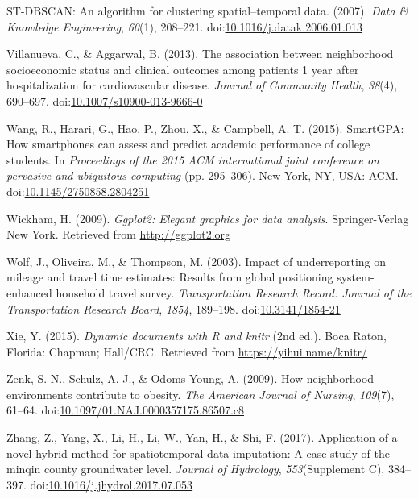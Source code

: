 \documentclass[man]{apa6}
\theoremstyle{definition}
\theoremstyle{definition}
\theoremstyle{definition}
\theoremstyle{remark}
\begin{document}
\hypertarget{ref-_st-dbscan:_2007}{}
ST-DBSCAN: An algorithm for clustering spatial--temporal data. (2007).
\emph{Data \& Knowledge Engineering}, \emph{60}(1), 208--221.
doi:\href{https://doi.org/10.1016/j.datak.2006.01.013}{10.1016/j.datak.2006.01.013}

\hypertarget{ref-villanueva_association_2013}{}
Villanueva, C., \& Aggarwal, B. (2013). The association between
neighborhood socioeconomic status and clinical outcomes among patients 1
year after hospitalization for cardiovascular disease. \emph{Journal of
Community Health}, \emph{38}(4), 690--697.
doi:\href{https://doi.org/10.1007/s10900-013-9666-0}{10.1007/s10900-013-9666-0}

\hypertarget{ref-wang_smartgpa:_2015}{}
Wang, R., Harari, G., Hao, P., Zhou, X., \& Campbell, A. T. (2015).
SmartGPA: How smartphones can assess and predict academic performance of
college students. In \emph{Proceedings of the 2015 ACM international
joint conference on pervasive and ubiquitous computing} (pp. 295--306).
New York, NY, USA: ACM.
doi:\href{https://doi.org/10.1145/2750858.2804251}{10.1145/2750858.2804251}

\hypertarget{ref-R-ggplot2}{}
Wickham, H. (2009). \emph{Ggplot2: Elegant graphics for data analysis}.
Springer-Verlag New York. Retrieved from \url{http://ggplot2.org}

\hypertarget{ref-wolf_impact_2003}{}
Wolf, J., Oliveira, M., \& Thompson, M. (2003). Impact of underreporting
on mileage and travel time estimates: Results from global positioning
system-enhanced household travel survey. \emph{Transportation Research
Record: Journal of the Transportation Research Board}, \emph{1854},
189--198. doi:\href{https://doi.org/10.3141/1854-21}{10.3141/1854-21}

\hypertarget{ref-R-knitr}{}
Xie, Y. (2015). \emph{Dynamic documents with R and knitr} (2nd ed.).
Boca Raton, Florida: Chapman; Hall/CRC. Retrieved from
\url{https://yihui.name/knitr/}

\hypertarget{ref-zenk_how_2009}{}
Zenk, S. N., Schulz, A. J., \& Odoms-Young, A. (2009). How neighborhood
environments contribute to obesity. \emph{The American Journal of
Nursing}, \emph{109}(7), 61--64.
doi:\href{https://doi.org/10.1097/01.NAJ.0000357175.86507.c8}{10.1097/01.NAJ.0000357175.86507.c8}

\hypertarget{ref-zhang_application_2017}{}
Zhang, Z., Yang, X., Li, H., Li, W., Yan, H., \& Shi, F. (2017).
Application of a novel hybrid method for spatiotemporal data imputation:
A case study of the minqin county groundwater level. \emph{Journal of
Hydrology}, \emph{553}(Supplement C), 384--397.
doi:\href{https://doi.org/10.1016/j.jhydrol.2017.07.053}{10.1016/j.jhydrol.2017.07.053}

\endgroup
\end{document}
